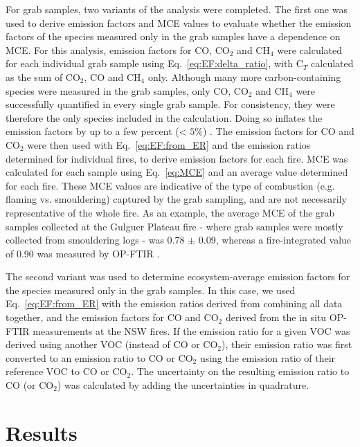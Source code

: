 \documentclass[acp, manuscript]{copernicus}
\begin{document}
For grab samples, two variants of the analysis were completed. The first one was used to derive emission factors and MCE values to evaluate whether the emission factors of the species measured only in the grab samples have a dependence on MCE. For this analysis, emission factors for CO, CO$_2$ and CH$_4$ were calculated for each individual grab sample using Eq.~\ref{eq:EF:delta_ratio}, with C$_T$ calculated as the sum of CO$_2$, CO and CH$_4$ only. Although many more carbon-containing species were measured in the grab samples, only CO, CO$_2$ and CH$_4$ were successfully quantified in every single grab sample. For consistency, they were therefore the only species included in the calculation. Doing so inflates the emission factors by up to a few percent (< $5 \%$) \citep{Gilman2015,Yokelson2013}. The emission factors for CO and CO$_2$ were then used with Eq.~\ref{eq:EF:from_ER} and the emission ratios determined for individual fires, to derive emission factors for each fire. MCE was calculated for each sample using Eq.~\ref{eq:MCE} and an average value determined for each fire. These MCE values are indicative of the type of combustion (e.g. flaming vs. smouldering) captured by the grab sampling, and are not necessarily representative of the whole fire. As an example, the average MCE of the grab samples collected at the Gulguer Plateau fire - where grab samples were mostly collected from smouldering logs - was 0.78 $\pm$ 0.09, whereas a fire-integrated value of 0.90 was measured by OP-FTIR \citep{Paton-Walsh2014}.

The second variant was used to determine ecosystem-average emission factors for the species measured only in the grab samples. In this case, we used Eq.~\ref{eq:EF:from_ER} with the emission ratios derived from combining all data together, and the emission factors for CO and CO$_2$ derived from the in situ OP-FTIR measurements at the NSW fires. If the emission ratio for a given VOC was derived using another VOC (instead of CO or CO$_2$), their emission ratio was first converted to an emission ratio to CO or CO$_2$ using the emission ratio of their reference VOC to CO or CO$_2$. The uncertainty on the resulting emission ratio to CO (or CO$_2$) was calculated by adding the uncertainties in quadrature. 

 
\section{Results}
\end{document}
